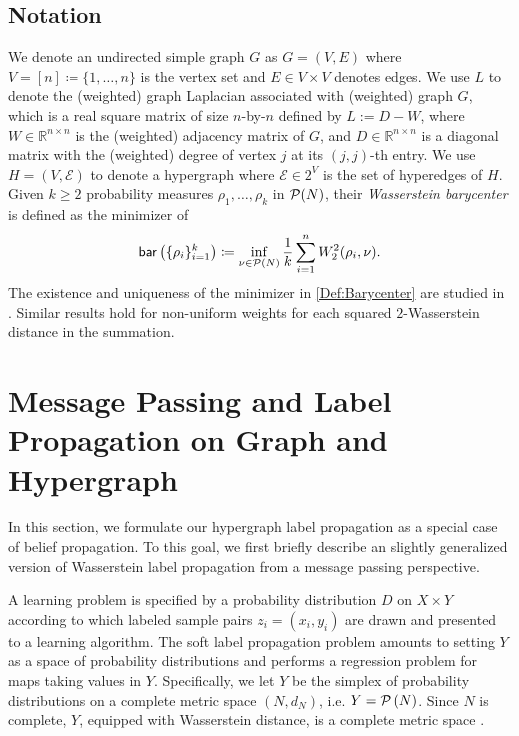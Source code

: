 \documentclass[letterpaper]{article} %
\begin{document}
\subsection{Notation}
We denote an undirected simple graph $G$ as $G=(V, E)$ where $V=[n]\coloneqq\{1, \dots, n\}$ is the vertex set and $E\in V\times V$ denotes edges. We use $L$ to denote the (weighted) graph Laplacian associated with (weighted) graph $G$, which is a real square matrix of size $n$-by-$n$ defined by $L:=D-W$, where $W\in \mathbb{R}^{n\times n}$ is the (weighted) adjacency matrix of $G$, and $D\in \mathbb{R}^{n\times n}$ is a diagonal matrix with the (weighted) degree of vertex $j$ at its $\left( j,j \right)$-th entry. We use $H=(V, \mathcal E)$ to denote a hypergraph where $\mathcal E\in 2^V$ is the set of hyperedges of $H$. Given $k\geq 2$ probability measures $\rho_1, \dots, \rho_k$ in $\P(N)$, their \textit{Wasserstein barycenter} is defined as the minimizer of
\begin{equation}\label{Def:Barycenter}
    \mathsf{bar}\left(\{\rho_i\}_{i=1}^k\right)\coloneqq \inf_{\nu\in \P(N)}\frac{1}{k}\sum_{i=1}^nW_2^2(\rho_i, \nu).
\end{equation} The existence and uniqueness of the minimizer in \eqref{Def:Barycenter} are studied in \cite{Wasserstein_Barycenter}. Similar results hold for non-uniform weights for each squared $2$-Wasserstein distance in the summation.


\section{Message Passing and Label Propagation on Graph and Hypergraph}
In this section, we formulate our hypergraph label propagation as a special case of belief propagation. To this goal, we first briefly describe an slightly generalized version of Wasserstein label propagation \cite{Solomon:2014} from a message passing perspective.


A learning problem is specified by a probability distribution $D$ on $X\times Y$  according to which labeled sample pairs $z_i=\left( x_i,y_i \right)$ are drawn and presented to a learning algorithm. The soft label propagation problem amounts to setting $Y$ as a space of probability distributions and performs a regression problem for maps taking values in $Y$. Specifically, we let $Y$ be the simplex of probability distributions on a complete metric space $\left( N,d_N \right)$, i.e. $Y=\P\left( N \right)$. Since $N$ is complete, 
$Y$, equipped with Wasserstein distance, is a complete metric space \cite[Theorem 6.18]{villani2003topics}.
\end{document}
